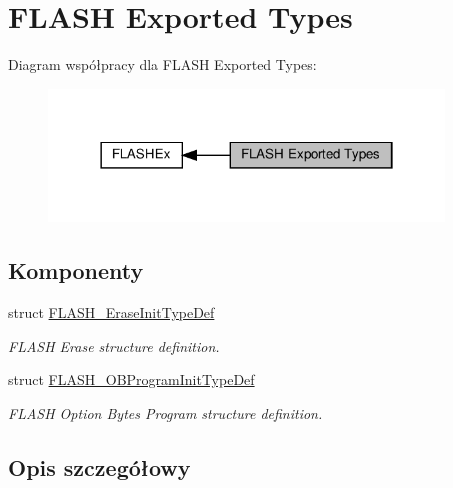 \hypertarget{group___f_l_a_s_h_ex___exported___types}{}\section{F\+L\+A\+SH Exported Types}
\label{group___f_l_a_s_h_ex___exported___types}
Diagram współpracy dla F\+L\+A\+SH Exported Types\+:\nopagebreak
\begin{figure}[H]
\begin{center}
\leavevmode
\includegraphics[width=298pt]{group___f_l_a_s_h_ex___exported___types}
\end{center}
\end{figure}
\subsection*{Komponenty}
\begin{DoxyCompactItemize}
\item 
struct \hyperlink{struct_f_l_a_s_h___erase_init_type_def}{F\+L\+A\+S\+H\+\_\+\+Erase\+Init\+Type\+Def}
\begin{DoxyCompactList}\small\item\em F\+L\+A\+SH Erase structure definition. \end{DoxyCompactList}\item 
struct \hyperlink{struct_f_l_a_s_h___o_b_program_init_type_def}{F\+L\+A\+S\+H\+\_\+\+O\+B\+Program\+Init\+Type\+Def}
\begin{DoxyCompactList}\small\item\em F\+L\+A\+SH Option Bytes Program structure definition. \end{DoxyCompactList}\end{DoxyCompactItemize}


\subsection{Opis szczegółowy}
